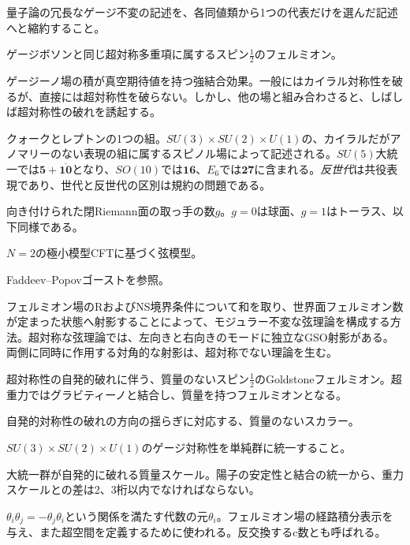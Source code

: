 {量子論の冗長なゲージ不変の記述を、各同値類から1つの代表だけを選んだ記述へと縮約すること。}

{ゲージボソンと同じ超対称多重項に属するスピン$\frac12$のフェルミオン。}

{ゲージーノ場の積が真空期待値を持つ強結合効果。一般にはカイラル対称性を破るが、直接には超対称性を破らない。しかし、他の場と組み合わさると、しばしば超対称性の破れを誘起する。}

{クォークとレプトンの1つの組。$SU(3)\times SU(2)\times U(1)$の、カイラルだがアノマリーのない表現の組に属するスピノル場によって記述される。$SU(5)$大統一では$\mathbf5+\overline{\mathbf{10}}$となり、$SO(10)$では$\mathbf{16}$、$E_6$では$\mathbf{27}$に含まれる。\emph{反世代}は共役表現であり、世代と反世代の区別は規約の問題である。}

{向き付けられた閉Riemann面の取っ手の数$g$。$g=0$は球面、$g=1$はトーラス、以下同様である。}

{$N=2$の極小模型CFTに基づく弦模型。}

{Faddeev--Popovゴーストを参照。}

{フェルミオン場のRおよびNS境界条件について和を取り、世界面フェルミオン数が定まった状態へ射影することによって、モジュラー不変な弦理論を構成する方法。超対称な弦理論では、左向きと右向きのモードに独立なGSO射影がある。両側に同時に作用する対角的な射影は、超対称でない理論を生む。}

{超対称性の自発的破れに伴う、質量のないスピン$\frac12$のGoldstoneフェルミオン。超重力ではグラビティーノと結合し、質量を持つフェルミオンとなる。}

{自発的対称性の破れの方向の揺らぎに対応する、質量のないスカラー。}

{$SU(3)\times SU(2)\times U(1)$のゲージ対称性を単純群に統一すること。}

{大統一群が自発的に破れる質量スケール。陽子の安定性と結合の統一から、重力スケールとの差は2、3桁以内でなければならない。}

{$\theta_i\theta_j=-\theta_j\theta_i$という関係を満たす代数の元$\theta_i$。フェルミオン場の経路積分表示を与え、また超空間を定義するために使われる。反交換するc数とも呼ばれる。}

